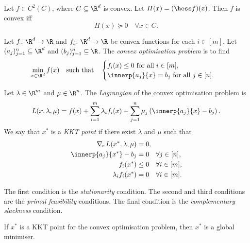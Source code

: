 \begin{theorem*}
    Let $f \in C^2(C)$, where $C \subseteq \R^d$ is convex.
    Let $H(x) = (\hess f)(x)$.
    Then $f$ is convex iff \[
        H(x) \succeq 0 \quad \forall x \in C.
    \]
\end{theorem*}

\begin{definition*} \label{def:convexopt}
    Let $f\colon \R^d \to \R$ and $f_i\colon \R^d \to \R$ be convex
    functions for each $i \in [m]$.
    Let $(a_j)_{j=1}^n \subseteq \R^d$ and $(b_j)_{j=1}^n \subseteq \R$.
    The \emph{convex optimisation problem} is to find \[
        \min_{x \in \R^d} f(x) \quad \text{such that} \quad \begin{cases}
            f_i(x) \le 0 \text{ for all } i \in [m], \\
            \innerp{a_j}{x} = b_j \text{ for all } j \in [n].
        \end{cases}
    \]
\end{definition*}
\begin{definition*}[Lagrangian] \label{def:convex:lagrangian}
    Let $\lambda \in \R^m$ and $\mu \in \R^n$.
    The \emph{Lagrangian} of the convex optimisation problem is \[
        L(x, \lambda, \mu) = f(x) + \sum_{i=1}^{m} \lambda_i f_i(x)
            + \sum_{j=1}^{n} \mu_j \left(\innerp{a_j}{x} - b_j\right).
    \] We say that $x^*$ is a \emph{KKT point} if there exist $\lambda$ and
    $\mu$ such that
    \begin{align*}
        \nabla_{\!x\,} L(x^*, \lambda, \mu) &= 0, \\
        \innerp{a_j}{x^*} - b_j &= 0 \quad \forall j \in [n], \\
        f_i(x^*) &\le 0 \quad \forall i \in [m], \\
        \lambda_i f_i(x^*) &= 0 \quad \forall i \in [m].
    \end{align*}
\end{definition*}
The first condition is the \emph{stationarity} condition.
The second and third conditions are the \emph{primal feasibility}
conditions.
The final condition is the \emph{complementary slackness} condition.
\begin{theorem*}
    If $x^*$ is a KKT point for the convex optimisation problem, then
    $x^*$ is a global minimiser.
\end{theorem*}
